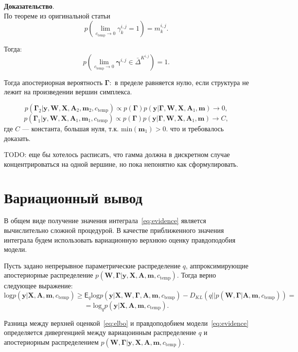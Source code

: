 \documentclass[12pt]{article}
\begin{document}
\textbf{Доказательство}.\\
По теореме из оригинальной статьи 
$$p(\lim_{c_{\text{temp}} \to 0} {\gamma}^{i,j}_k  = 1) = {m}^{i,j}_k.$$

Тогда:
$$p(\lim_{c_{\text{temp}} \to 0} \boldsymbol{\gamma}^{i,j} \in \bar{\Delta}^{K^{i,j}}) = 1.$$

Тогда апостериорная вероятность $\boldsymbol{\Gamma}:$ в пределе равняется нулю, если структура не лежит на произведении вершин симплекса.

$$p(\boldsymbol{\Gamma}_2|\mathbf{y}, \mathbf{W}, \mathbf{X},\mathbf{A}_2,\mathbf{m}_2, {c_\text{temp}}) \propto p(\boldsymbol{\Gamma}) p(\mathbf{y} |\boldsymbol{\Gamma},   \mathbf{W}, \mathbf{X},\mathbf{A}_1,\mathbf{m}) \to 0,$$
$$p(\boldsymbol{\Gamma}_1|\mathbf{y}, \mathbf{W}, \mathbf{X},\mathbf{A}_1,\mathbf{m}_1, {c_\text{temp}}) \propto p(\boldsymbol{\Gamma}) p(\mathbf{y} |\boldsymbol{\Gamma},   \mathbf{W}, \mathbf{X},\mathbf{A}_1,\mathbf{m}) \to C,$$
где $C$ --- константа, большая нуля, т.к. $ \text{min}(\mathbf{m}_1)>0$.
что и требовалось доказать.

TODO: еще бы хотелось расписать, что гамма должна в дискретном случае концентрироваться на одной вершине, но пока непонятно как сформулировать.


\section{Вариационный вывод}
В общем виде получение значения интеграла~\eqref{eq:evidence} является вычислительно сложной процедурой. В качестве приближенного значения интеграла будем использовать вариационную верхнюю оценку правдоподобия модели. 

Пусть задано непрерывное параметрические распределение $q$, аппроксимирующие апостериорные распределение $p(\mathbf{W}, \boldsymbol{\Gamma}|\mathbf{y}, \mathbf{X}, \mathbf{A},\mathbf{m}, c_{\text{temp}})$.
Тогда верно следующее выражение:
\begin{equation}
\label{eq:elbo}
    \text{log} p(\mathbf{y}|\mathbf{X},\mathbf{A},\mathbf{m}, c_{\text{temp}})  \geq \mathsf{E}_{q}\text{log} p(\mathbf{y}|\mathbf{X},\mathbf{W}, \boldsymbol{\Gamma}, \mathbf{A},\mathbf{m}, c_{\text{temp}}) - {D_{KL}}(q||p(\mathbf{W}, \boldsymbol{\Gamma}| \mathbf{A},\mathbf{m}, c_{\text{temp}})) = 
\end{equation}
\[
= \text{log}_q {p}(\mathbf{y}|\mathbf{X},\mathbf{A},\mathbf{m}, c_{\text{temp}}).
\]


Разница между верхней оценкой~\eqref{eq:elbo} и правдоподобием модели~\eqref{eq:evidence} определяется дивергенцией между вариацоинным распределение $q$ и апостериорным распределением $p(\mathbf{W}, \boldsymbol{\Gamma}|\mathbf{y}, \mathbf{X}, \mathbf{A},\mathbf{m}, c_{\text{temp}})$. 
\end{document}
